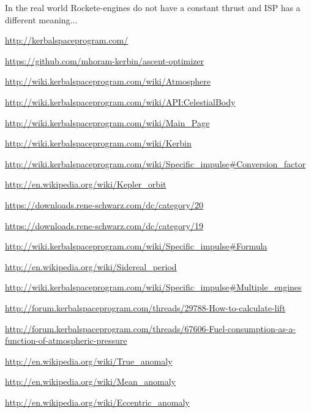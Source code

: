\documentclass[11pt]{report}
\begin{document}
In the real world Rockete-engines do not have a constant thrust and
ISP has a different meaning...

\printindex

\begin{thebibliography}{Kerbin}

  \url{http://kerbalspaceprogram.com/}

  \url{https://github.com/mhoram-kerbin/ascent-optimizer}

  \url{http://wiki.kerbalspaceprogram.com/wiki/Atmosphere}

  \url{http://wiki.kerbalspaceprogram.com/wiki/API:CelestialBody}

  \url{http://wiki.kerbalspaceprogram.com/wiki/Main_Page}

  \url{http://wiki.kerbalspaceprogram.com/wiki/Kerbin}

  \url{http://wiki.kerbalspaceprogram.com/wiki/Specific_impulse#Conversion_factor}

  \url{http://en.wikipedia.org/wiki/Kepler_orbit}

  \url{https://downloads.rene-schwarz.com/dc/category/20}

  \url{https://downloads.rene-schwarz.com/dc/category/19}

  \url{http://wiki.kerbalspaceprogram.com/wiki/Specific_impulse#Formula}

  \url{http://en.wikipedia.org/wiki/Sidereal_period}

  \url{http://wiki.kerbalspaceprogram.com/wiki/Specific_impulse#Multiple_engines}

  \url{http://forum.kerbalspaceprogram.com/threads/29788-How-to-calculate-lift}

  \url{http://forum.kerbalspaceprogram.com/threads/67606-Fuel-consumption-as-a-function-of-atmospheric-pressure}

  \url{http://en.wikipedia.org/wiki/True_anomaly}

  \url{http://en.wikipedia.org/wiki/Mean_anomaly}

  \url{http://en.wikipedia.org/wiki/Eccentric_anomaly}


\end{thebibliography}
\end{document}
